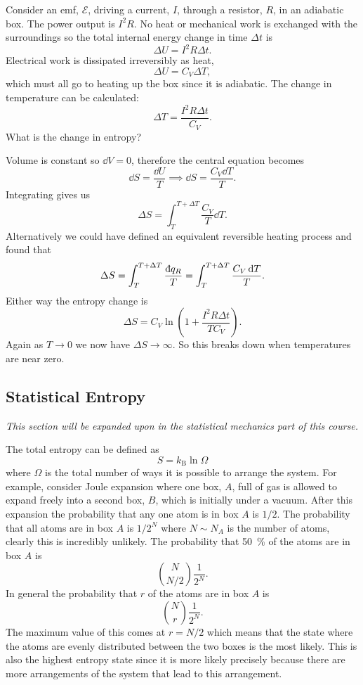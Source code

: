 \documentclass[a4paper]{article}
\newcommand{\boltzmann}{k_\mathrm{B}}
\newcommand{\ddbar}[1]{\text{\dj}{#1}}
\newcommand{\emf}{\mathcal{E}}
\begin{document}
    \begin{example}
        Consider an emf, \(\emf\), driving a current, \(I\), through a resistor, \(R\), in an adiabatic box.
        The power output is \(I^2R\).
        No heat or mechanical work is exchanged with the surroundings so the total internal energy change in time \(\Delta t\) is
        \[\Delta U = I^2R\Delta t.\]
        Electrical work is dissipated irreversibly as heat,
        \[\Delta U = C_V\Delta T,\]
        which must all go to heating up the box since it is adiabatic.
        The change in temperature can be calculated:
        \[\Delta T = \frac{I^2R\Delta t}{C_V}.\]
        What is the change in entropy?
        
        Volume is constant so \(\dd{V} = 0\), therefore the central equation becomes
        \[\dd{S} = \frac{\dd{U}}{T} \implies \dd{S} = \frac{C_V\dd{T}}{T}.\]
        Integrating gives us
        \[\Delta S = \int_{T}^{T + \Delta T} \frac{C_V}{T}\dd{T}.\]
        Alternatively we could have defined an equivalent reversible heating process and found that
        \[\Delta S = \int_{T}^{T + \Delta T}\frac{\ddbar{q_R}}{T} = \int_{T}^{T + \Delta T}\frac{C_V\dd{T}}{T}.\]
        Either way the entropy change is
        \[\Delta S = C_V\ln\left(1 + \frac{I^2R\Delta t}{TC_V}\right).\]
        Again as \(T \to 0\) we now have \(\Delta S \to\infty\).
        So this breaks down when temperatures are near zero.
    \end{example}
    
    \subsection{Statistical Entropy}
    \textit{This section will be expanded upon in the statistical mechanics part of this course.}
    
    The total entropy can be defined as
    \[S = \boltzmann\ln\Omega\]
    where \(\Omega\) is the total number of ways it is possible to arrange the system.
    For example, consider Joule expansion where one box, \(A\), full of gas is allowed to expand freely into a second box, \(B\), which is initially under a vacuum.
    After this expansion the probability that any one atom is in box \(A\) is \(1/2\).
    The probability that all atoms are in box \(A\) is \(1/2^N\) where \(N\sim N_A\) is the number of atoms, clearly this is incredibly unlikely.
    The probability that \SI{50}{\percent} of the atoms are in box \(A\) is
    \[{N\choose N/2} \frac{1}{2^N}.\]
    In general the probability that \(r\) of the atoms are in box \(A\) is
    \[{N\choose r}\frac{1}{2^N}.\]
    The maximum value of this comes at \(r = N/2\) which means that the state where the atoms are evenly distributed between the two boxes is the most likely.
    This is also the highest entropy state since it is more likely precisely because there are more arrangements of the system that lead to this arrangement.
    
\end{document}
